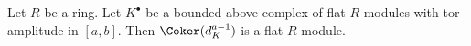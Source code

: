 \begin{lemma}
\label{lemma-last-one-flat}
Let $R$ be a ring. Let $K^\bullet$ be a bounded above complex of
flat $R$-modules with tor-amplitude in $[a, b]$.
Then $\Coker(d_K^{a - 1})$ is a flat $R$-module.
\end{lemma}
